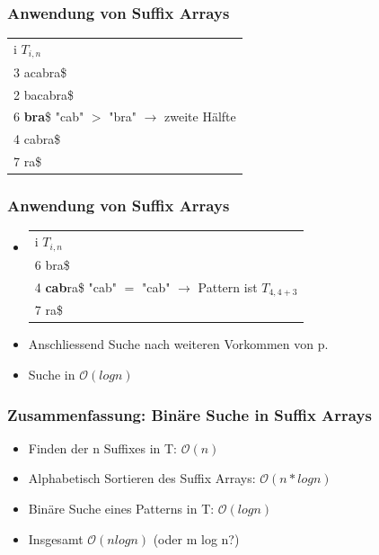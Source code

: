 \documentclass{beamer}
\begin{document}
\begin{frame}
\frametitle{Anwendung von Suffix Arrays}
\begin{tabular}{l}
	i $T_{i,n}$\\
3 acabra\$\\
2 bacabra\$\\
6 \color{red}\textbf{bra}\color{black}\$ "cab" $>$ "bra" $\rightarrow$ zweite H\"alfte\\
4 cabra\$\\
7 ra\$\\
	\end{tabular}
\end{frame}
\begin{frame}
\frametitle{Anwendung von Suffix Arrays}
\begin{itemize}
\item
\begin{tabular}{l}
	i $T_{i,n}$\\
6 bra\$\\
4 \color{red}\textbf{cab}\color{black}ra\$ "cab" $=$ "cab" $\rightarrow$ Pattern ist $T_{4,4+3}$\\
7 ra\$\\
	\end{tabular}\newline
\item Anschliessend Suche nach weiteren Vorkommen von p.
\item Suche in ${ \scriptstyle \mathcal{O	}}(log n)$
	\end{itemize}
\end{frame}
\begin{frame}
\frametitle{Zusammenfassung: Bin\"are Suche in Suffix Arrays}
\begin{itemize}
\item Finden der n Suffixes in T: ${ \scriptstyle \mathcal{O	}}(n)$
\item Alphabetisch Sortieren des Suffix Arrays: ${ \scriptstyle \mathcal{O	}}(n*log n)$
\item Bin\"are Suche eines Patterns in T: ${ \scriptstyle \mathcal{O	}}(log n)$
\item Insgesamt ${ \scriptstyle \mathcal{O	}}(n log n)$ (oder m log n?)
\end{itemize}
\end{frame}
\end{document}
